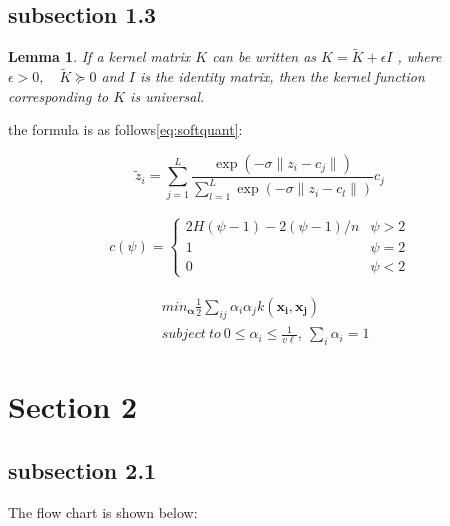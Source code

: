 \documentclass[10pt,letterpaper,onecolumn,fontset=none]{ctexart} %
\newtheorem{lemma}{Lemma}[subsection]
\begin{document}
\subsection{subsection 1.3}
\lipsum[22]
\begin{lemma} \label{Kexist}
    If a kernel matrix $K$ can be written as $K=\tilde{K}+\epsilon I$ , where $\epsilon > 0,\quad \tilde{K} \succeq 0$ and $I$ is the identity matrix, then the kernel function corresponding to $K$ is universal\cite{zjugradthesisrules}.
\end{lemma}
\lipsum[5]   %
\par the formula is as follows\ref{eq:softquant}:

\begin{equation} \label{eq:softquant}
\tilde{z}_i = \sum_{j=1}^L \frac{\exp(-\sigma\|z_i-c_j\|)}{\sum_{l=1}^L \exp(-\sigma\|z_i-c_l\|)} c_j
\end{equation}

\begin{eqnarray} \label{eq:case1}
	c(\psi) = 
	\begin{cases}
	  2H(\psi-1)-2(\psi-1)/n   & \psi>2\\
	  1                        & \psi=2\\
	  0                        & \psi<2  
	\end{cases}
\end{eqnarray}

\begin{equation} \label{eq:case2}
	\begin{split}
	  &min_\mathbf{\alpha}\frac{1}{2}\sum_{ij}\alpha_i\alpha_j k(\mathbf{x_i},\mathbf{x_j}) \\
	  &subject\ to\ 0 \leq \alpha_i \leq \frac{1}{v\ell},\ \sum_{i}^{}\alpha_i=1
	\end{split}
\end{equation}

\section{Section 2}

\subsection{subsection 2.1}
\lipsum[2]   %
The flow chart is shown below\cite{zjuthesisrules}:
\end{document}
